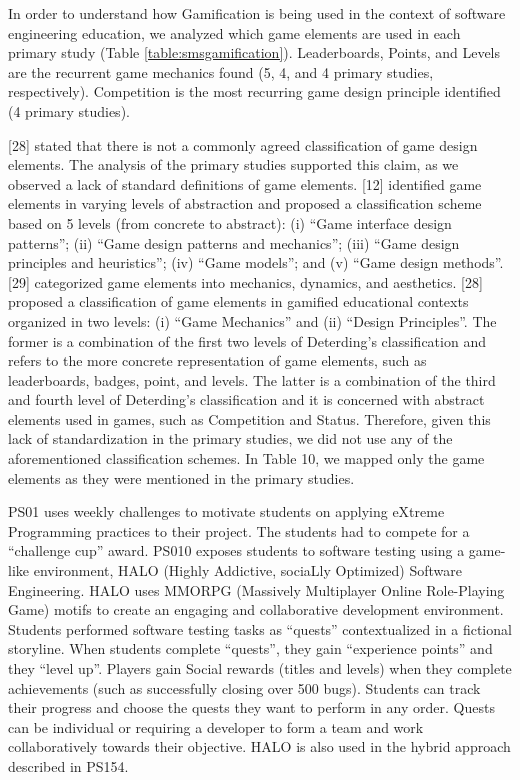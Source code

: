 In order to understand how Gamification is being used in the context of software engineering education, we analyzed which game elements are used in each primary study (Table \ref{table:smsgamification}). Leaderboards, Points, and Levels are the recurrent game mechanics found (5, 4, and 4 primary studies, respectively). Competition is the most recurring game design principle identified (4 primary studies).



\cite{Dicheva:2015}[28] stated that there is not a commonly agreed classification of game design elements. The analysis of the primary studies supported this claim, as we observed a lack of standard definitions of game elements. \cite{Deterding:2011}[12] identified game elements in varying levels of abstraction and proposed a classification scheme based on 5 levels (from concrete to abstract): (i) “Game interface design patterns”; (ii) “Game design patterns and mechanics”; (iii) “Game design principles and heuristics”; (iv) “Game models”; and (v) “Game design methods”.  \cite{Zichermann:2011}[29] categorized game elements into mechanics, dynamics, and aesthetics. \cite{Dicheva:2015}[28] proposed a classification of game elements in gamified educational contexts organized in two levels: (i) “Game Mechanics” and (ii) “Design Principles”. The former is a combination of the first two levels of Deterding’s classification and refers to the more concrete representation of game elements, such as leaderboards, badges, point, and levels. The latter is a combination of the third and fourth level of Deterding’s classification and it is concerned with abstract elements used in games, such as Competition and Status. Therefore, given this lack of standardization in the primary studies, we did not use any of the aforementioned classification schemes. In Table 10, we mapped only the game elements as they were mentioned in the primary studies.

PS01 uses weekly challenges to motivate students on applying eXtreme Programming practices to their project. The students had to compete for a “challenge cup” award. PS010 exposes students to software testing using a game-like environment, HALO (Highly Addictive, sociaLly Optimized) Software Engineering. HALO uses MMORPG (Massively Multiplayer Online Role-Playing Game) motifs to create an engaging and collaborative development environment. Students performed software testing tasks as “quests” contextualized in a fictional storyline. When students complete “quests”, they gain “experience points” and they “level up”. Players gain Social rewards (titles and levels) when they complete achievements (such as successfully closing over 500 bugs). Students can track their progress and choose the quests they want to perform in any order. Quests can be individual or requiring a developer to form a team and work collaboratively towards their objective. HALO is also used in the hybrid approach described in PS154.

